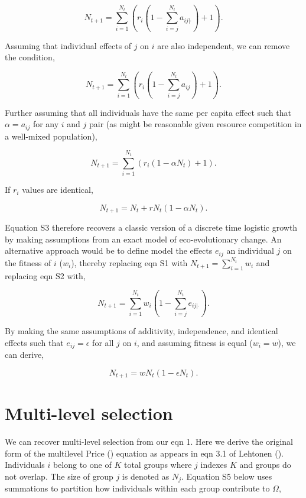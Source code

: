 \documentclass[
]{article}
\begin{document}
\[N_{t+1} = \sum_{i=1}^{N_{t}}\left(r_{i}\left(1 - \sum_{i = j}^{N_{t}}a_{ij|\cdot} \right) + 1\right).
\tag{S2}
\]

Assuming that individual effects of \(j\) on \(i\) are also independent,
we can remove the condition,

\[N_{t+1} = \sum_{i=1}^{N_{t}}\left(r_{i}\left(1 - \sum_{i = j}^{N_{t}}a_{ij} \right) + 1\right).\]

Further assuming that all individuals have the same per capita effect
such that \(\alpha = a_{ij}\) for any \(i\) and \(j\) pair (as might be
reasonable given resource competition in a well-mixed population),

\[N_{t+1} = \sum_{i=1}^{N_{t}}\left(r_{i}\left(1 - \alpha N_{t} \right) + 1\right).\]

If \(r_{i}\) values are identical,

\[N_{t+1} = N_{t} + r N_{t}\left(1 - \alpha N_{t} \right).
\tag{S3}
\]

Equation S3 therefore recovers a classic version of a discrete time
logistic growth by making assumptions from an exact model of
eco-evolutionary change. An alternative approach would be to define
model the effects \(e_{ij}\) an individual \(j\) on the fitness of \(i\)
(\(w_{i}\)), thereby replacing eqn S1 with
\(N_{t+1} = \sum_{i=1}^{N_{t}}w_{i}\) and replacing eqn S2 with,

\[N_{t+1} = \sum_{i=1}^{N_{t}}w_{i}\left(1 - \sum_{i = j}^{N_{t}}e_{ij|\cdot} \right).
\]

By making the same assumptions of additivity, independence, and
identical effects such that \(e_{ij} = \epsilon\) for all \(j\) on
\(i\), and assuming fitness is equal (\(w_{i} = w\)), we can derive,

\[N_{t+1} = wN_{t}(1 - \epsilon N_{t}).
\tag{S4}
\]

\section{Multi-level selection}\label{multi-level-selection}

We can recover multi-level selection from our eqn 1. Here we derive the
original form of the multilevel Price ()
equation as appears in eqn 3.1 of Lehtonen
(). Individuals \(i\) belong to one of
\(K\) total groups where \(j\) indexes \(K\) and groups do not overlap.
The size of group \(j\) is denoted as \(N_{j}\). Equation S5 below uses
summations to partition how individuals within each group contribute to
\(\Omega\),
\end{document}
